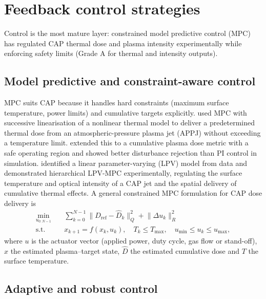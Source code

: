 \documentclass[preprint,review,12pt,authoryear]{elsarticle}
\begin{document}
\section{Feedback control strategies}
\label{sec:control}

Control is the most mature layer: constrained model predictive control (MPC) has regulated CAP thermal dose and plasma intensity experimentally while enforcing safety limits (Grade A for thermal and intensity outputs).

\subsection{Model predictive and constraint-aware control}

MPC suits CAP because it handles hard constraints (maximum surface temperature, power limits) and cumulative targets explicitly. \citet{gidon2016} used MPC with successive linearisation of a nonlinear thermal model to deliver a predetermined thermal dose from an atmospheric-pressure plasma jet (APPJ) without exceeding a temperature limit. \citet{gidon2017} extended this to a cumulative plasma dose metric with a safe operating region and showed better disturbance rejection than PI control in simulation. \citet{gidon2021} identified a linear parameter-varying (LPV) model from data and demonstrated hierarchical LPV-MPC experimentally, regulating the surface temperature and optical intensity of a CAP jet and the spatial delivery of cumulative thermal effects. A general constrained MPC formulation for CAP dose delivery is
\begin{equation}
\begin{aligned}
\min_{u_{0:N-1}} \quad & \sum_{k=0}^{N-1} \bigl\| D_{\mathrm{ref}} - \hat{D}_{k} \bigr\|_{Q}^{2} + \bigl\| \Delta u_k \bigr\|_{R}^{2} \\
\text{s.t.} \quad & x_{k+1} = f(x_k, u_k), \quad T_k \le T_{\max}, \quad u_{\min} \le u_k \le u_{\max},
\end{aligned}
\label{eq:mpc}
\end{equation}
where $u$ is the actuator vector (applied power, duty cycle, gas flow or stand-off), $x$ the estimated plasma--target state, $\hat{D}$ the estimated cumulative dose and $T$ the surface temperature.

\subsection{Adaptive and robust control}
\end{document}
